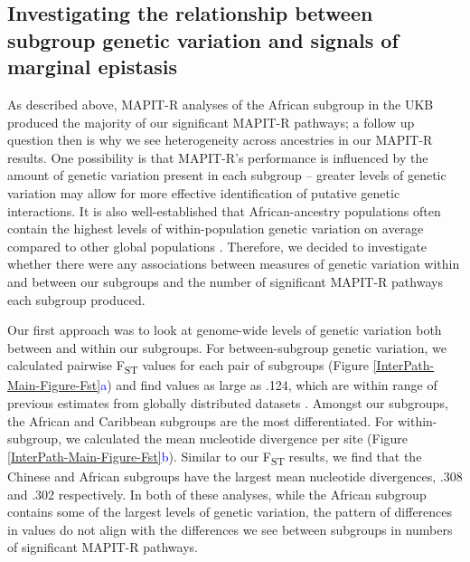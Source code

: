 \documentclass[12pt,a4paper]{article}
\begin{document}

\subsection{Investigating the relationship between subgroup genetic variation and signals of marginal epistasis}

As described above, MAPIT-R analyses of the African subgroup in the UKB produced the majority of our significant MAPIT-R pathways; a follow up question then is why we see heterogeneity across ancestries in our MAPIT-R results. One possibility is that MAPIT-R's performance is influenced by the amount of genetic variation present in each subgroup -- greater levels of genetic variation may allow for more effective identification of putative genetic interactions. It is also well-established that African-ancestry populations often contain the highest levels of within-population genetic variation on average compared to other global populations \citep{International2010,Genomes2015,Mallick2016}. Therefore, we decided to investigate whether there were any associations between measures of genetic variation within and between our subgroups and the number of significant MAPIT-R pathways each subgroup produced.

Our first approach was to look at genome-wide levels of genetic variation both between and within our subgroups. For between-subgroup genetic variation, we calculated pairwise F\textsubscript{ST} values for each pair of subgroups (Figure \ref{InterPath-Main-Figure-Fst}\textcolor{blue}{a}) and find values as large as .124, which are within range of previous estimates from globally distributed datasets \citep{Ramachandran2005,Weir2005,Henn2011,Wang2012,Sugden2016}. Amongst our subgroups, the African and Caribbean subgroups are the most differentiated. For within-subgroup, we calculated the mean nucleotide divergence per site (Figure \ref{InterPath-Main-Figure-Fst}\textcolor{blue}{b}). Similar to our F\textsubscript{ST} results, we find that the Chinese and African subgroups have the largest mean nucleotide divergences, .308 and .302 respectively. In both of these analyses, while the African subgroup contains some of the largest levels of genetic variation, the pattern of differences in values do not align with the differences we see between subgroups in numbers of significant MAPIT-R pathways. 
\end{document}
